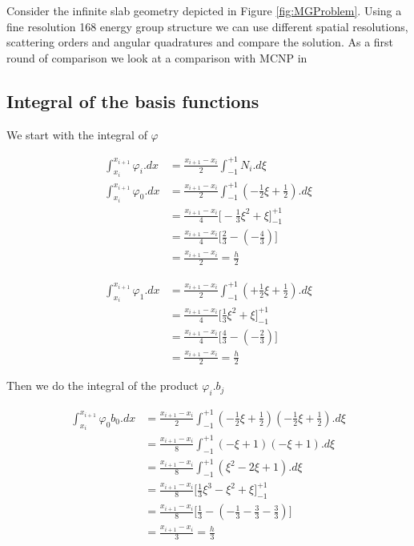 \documentclass[11pt,letterpaper,titlepage]{article}
\numberwithin{equation}{section}
\newcommand{\beq}{\begin{equation*}
\begin{aligned}}
\newcommand{\eeq}{\end{aligned}
\end{equation*}}
\begin{document}
Consider the infinite slab geometry depicted in Figure \ref{fig:MGProblem}. Using a fine resolution 168 energy group structure we can use different spatial resolutions, scattering orders and angular quadratures and compare the solution. As a first round of comparison we look at a comparison with MCNP in 




\newpage
\begin{appendices}
\section{Integral of the basis functions}
We start with the integral of $\varphi$

\beq
\int_{x_i}^{x_{i+1}} \varphi_i .dx &= \frac{x_{i+1}-x_i}{2} \int_{-1}^{+1} N_i .d\xi \\
\int_{x_i}^{x_{i+1}} \varphi_0 .dx &= \frac{x_{i+1}-x_i}{2} \int_{-1}^{+1} (-\frac{1}{2}\xi+\frac{1}{2}) .d\xi \\
&=  \frac{x_{i+1}-x_i}{4} \biggr[-\frac{1}{3}\xi^2 + \xi \biggr]_{-1}^{+1}\\
&=  \frac{x_{i+1}-x_i}{4} \biggr[\frac{2}{3} - (-\frac{4}{3}) \biggr]\\
&=\frac{x_{i+1}-x_i}{2}=\frac{h}{2}
\eeq 

\beq
\int_{x_i}^{x_{i+1}} \varphi_1 .dx &= \frac{x_{i+1}-x_i}{2} \int_{-1}^{+1} (+\frac{1}{2}\xi+\frac{1}{2}) .d\xi \\
&=  \frac{x_{i+1}-x_i}{4} \biggr[\frac{1}{3}\xi^2 + \xi \biggr]_{-1}^{+1}\\
&=  \frac{x_{i+1}-x_i}{4} \biggr[\frac{4}{3} - (-\frac{2}{3}) \biggr]\\
&=\frac{x_{i+1}-x_i}{2} = \frac{h}{2}
\eeq 

Then we do the integral of the product $\varphi_i.b_j$

\beq
\int_{x_i}^{x_{i+1}} \varphi_0 b_0.dx &= \frac{x_{i+1}-x_i}{2} \int_{-1}^{+1} (-\frac{1}{2}\xi+\frac{1}{2})(-\frac{1}{2}\xi+\frac{1}{2}) .d\xi \\
&=  \frac{x_{i+1}-x_i}{8} \int_{-1}^{+1} (-\xi +1 )(-\xi +1).d\xi \\
&=  \frac{x_{i+1}-x_i}{8} \int_{-1}^{+1} (\xi^2-2\xi+1 ).d\xi \\
&=  \frac{x_{i+1}-x_i}{8} \biggr[  \frac{1}{3}\xi^3 -\xi^2+\xi  \biggr]_{-1}^{+1}\\
&= \frac{x_{i+1}-x_i}{8} \biggr[  \frac{1}{3} - (-\frac{1}{3}-\frac{3}{3} -\frac{3}{3}) \biggr]\\
&=  \frac{x_{i+1}-x_i}{3} = \frac{h}{3}
\eeq 


\end{appendices}
\end{document}
